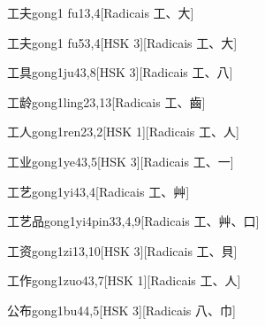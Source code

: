 \begin{entry}{工夫}{gong1 fu1}{3,4}[Radicais ⼯、⼤]
\end{entry}

\begin{entry}{工夫}{gong1 fu5}{3,4}[HSK 3][Radicais ⼯、⼤]
\end{entry}

\begin{entry}{工具}{gong1ju4}{3,8}[HSK 3][Radicais ⼯、⼋]
\end{entry}

\begin{entry}{工龄}{gong1ling2}{3,13}[Radicais ⼯、⿒]
\end{entry}

\begin{entry}{工人}{gong1ren2}{3,2}[HSK 1][Radicais ⼯、⼈]
\end{entry}

\begin{entry}{工业}{gong1ye4}{3,5}[HSK 3][Radicais ⼯、⼀]
\end{entry}

\begin{entry}{工艺}{gong1yi4}{3,4}[Radicais ⼯、⾋]
\end{entry}

\begin{entry}{工艺品}{gong1yi4pin3}{3,4,9}[Radicais ⼯、⾋、⼝]
\end{entry}

\begin{entry}{工资}{gong1zi1}{3,10}[HSK 3][Radicais ⼯、⾙]
\end{entry}

\begin{entry}{工作}{gong1zuo4}{3,7}[HSK 1][Radicais ⼯、⼈]
\end{entry}

\begin{entry}{公布}{gong1bu4}{4,5}[HSK 3][Radicais ⼋、⼱]
\end{entry}

